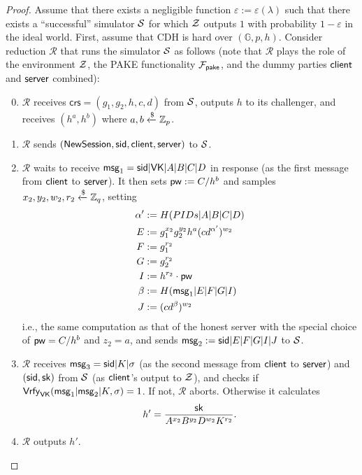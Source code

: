 \begin{proof}
	Assume that there exists a negligible function $\varepsilon:=\varepsilon(\lambda)$ such that there exists a ``successful'' simulator $\mathcal{S}$ for which $\mathcal{Z}$ outputs $1$ with probability $1-\varepsilon$ in the ideal world. First, assume that CDH is hard over $(\mathbb{G}, p, h)$. Consider reduction $\mathcal{R}$ that runs the simulator $\mathcal{S}$ as follows (note that $\mathcal{R}$ plays the role of the environment $\mathcal{Z}$, the PAKE functionality $\mathcal{F}_{\mathsf{pake}}$, and the dummy parties $\mathsf{client}$ and $\mathsf{server}$ combined):
	
	
	\begin{enumerate}\setcounter{enumi}{-1}
		\item $\mathcal{R}$ receives $\mathsf{crs}=(g_1, g_2, h, c, d)$ from $\mathcal{S}$, outputs $h$ to its challenger, and receives $(h^a, h^b)$ where $a,b\xleftarrow{\$}\mathbb{Z}_p$. 
		
		
		\item $\mathcal{R}$ sends $(\mathsf{NewSession},\mathsf{sid}, \mathsf{client}, \mathsf{server})$ to $\mathcal{S}$.
		\item $\mathcal{R}$ waits to receive $\mathsf{msg}_{1} = \mathsf{sid}|\mathsf{VK}|A|B|C|D$ in response (as the first message from $\mathsf{client}$ to $\mathsf{server}$). It then sets $\mathsf{pw}:=C/h^b$ and samples $x_2,y_2,w_2,r_2\xleftarrow{\$}\mathbb{Z}_q$, setting
		\begin{align*}
			\alpha'&:=H(PIDs|A|B|C|D)\\
			E &:= g_1^{x_2}g_2^{y_2}h^{a}(cd^{\alpha'})^{w_2}\\
			F &:= g_1^{r_2}\\
			G &:= g_2^{r_2}\\
			I &:= h^{r_2}\cdot\mathsf{pw}\\
			\beta &:= H(\mathsf{msg}_{1}|E|F|G|I)\\
			J &:= (cd^{\beta})^{w_2}
		\end{align*}
		i.e., the same computation as that of the honest server with the special choice of $\mathsf{pw} = C/h^b$ and $z_2 = a$, and sends $\mathsf{msg}_{2}:=\mathsf{sid}|E|F|G|I|J$ to $\mathcal{S}$.
		\item $\mathcal{R}$ receives $\mathsf{msg}_{3}=\mathsf{sid}|K|\sigma$ (as the second message from $\mathsf{client}$ to $\mathsf{server}$) and $(\mathsf{sid},\mathsf{sk})$ from $\mathcal{S}$ (as $\mathsf{client}$'s output to $\mathcal{Z}$), and checks if $\mathsf{Vrfy}_\mathsf{VK}(\mathsf{msg}_{1}|\mathsf{msg}_{2}|K,\sigma)=1$. If not, $\mathcal{R}$ aborts. Otherwise it calculates 
		$$h'=\frac{\mathsf{sk}}{A^{x_2}B^{y_2}D^{w_2}K^{r_2}}.$$
		\item $\mathcal{R}$ outputs $h'$.		
	\end{enumerate}
	

\end{proof}
